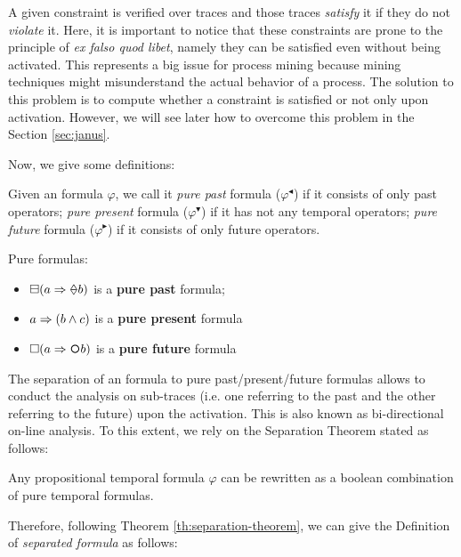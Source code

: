 A given \declare constraint is verified over traces and those traces \emph{satisfy} it if they do not \emph{violate} it. Here, it is important to notice that these constraints are prone to the principle of \textit{ex falso quod libet}, namely they can be satisfied even without being activated. This represents a big issue for process mining because mining techniques might misunderstand the actual behavior of a process. The solution to this problem is to compute whether a constraint is satisfied or not only upon activation. However, we will see later how to overcome this problem in the Section \ref{sec:janus}.

Now, we give some definitions:
\begin{definition}\citep{gabbay1989declarative}\label{def:pure-temp-formula}
Given an \LTLp formula $\varphi$, we call it \emph{pure past} formula ($\varphi^\blacktriangleleft$) if it consists of only past operators; \emph{pure present} formula ($\varphi^\blacktriangledown$) if it has not any temporal operators; \emph{pure future} formula ($\varphi^\blacktriangleright$) if it consists of only future operators.
\end{definition}
\begin{example}\label{ex:pure-formulas-examples}
Pure formulas:
\begin{itemize}
\item $\boxminus(a \Rightarrow \Once b)$ is a \textbf{pure past} formula;
\item $a \Rightarrow (b \wedge c)$ is a \textbf{pure present} formula
\item $\Box(a \Rightarrow \Next b)$ is a \textbf{pure future} formula
\end{itemize}
\end{example}
The separation of an \LTLp formula to pure past/present/future formulas allows to conduct the analysis on sub-traces (i.e. one referring to the past and the other referring to the future) upon the activation. This is also known as bi-directional on-line analysis. To this extent, we rely on the Separation Theorem stated as follows:
\begin{theorem}\citep{gabbay1989declarative}\label{th:separation-theorem}
Any propositional temporal formula $\varphi$ can be rewritten as a boolean combination of pure temporal formulas.
\end{theorem}
Therefore, following Theorem \ref{th:separation-theorem}, we can give the Definition of \textit{separated formula} as follows:
